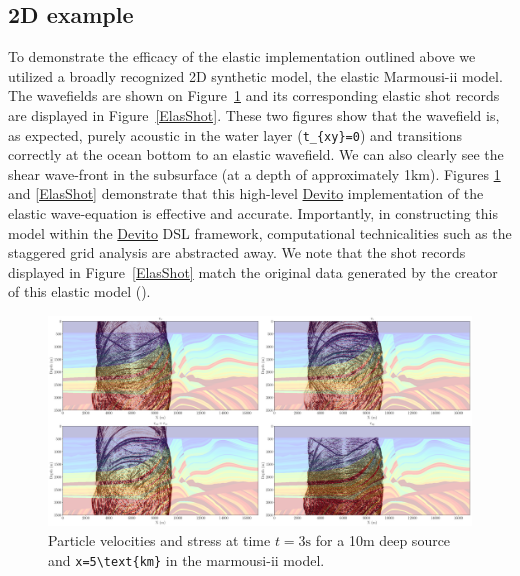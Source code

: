 \documentclass[conference]{IEEEtran}
\begin{document}
\subsection{2D example}\label{d-example}

To demonstrate the efficacy of the elastic implementation outlined
above we utilized a broadly recognized 2D synthetic model, the elastic
Marmousi-ii\cite{versteeg927, marmouelas} model. The wavefields are
shown on Figure~\ref{ElasWf} and its corresponding elastic shot records
are displayed in Figure~\ref{ElasShot}. These two figures show that the
wavefield is, as expected, purely acoustic in the water layer
(\texttt{t\_\{xy\}=0}) and transitions correctly at the ocean bottom to
an elastic wavefield. We can also clearly see the shear wave-front
in the subsurface (at a depth of approximately 1km). Figures \ref{ElasWf}
and \ref{ElasShot} demonstrate that this high-level \href{https://github.com/devitocodes/devito}{Devito} implementation
of the elastic wave-equation is effective and accurate.  Importantly, in
constructing this model within the \href{https://github.com/devitocodes/devito}{Devito} DSL framework, computational
technicalities such as the staggered grid analysis are abstracted away. We
note that the shot records displayed in Figure~\ref{ElasShot} match the
original data generated by the creator of this elastic model
(\cite{marmouelas}).

\begin{figure}
\centering
\includegraphics[width=1.000\hsize]{./Figures/marmou_snap.png}
\caption{Particle velocities and stress at time $t=3\text{s}$ for a
10m deep source and \texttt{x=5\textbackslash{}text\{km\}} in the
marmousi-ii model.}\label{ElasWf}
\end{figure}
\end{document}
